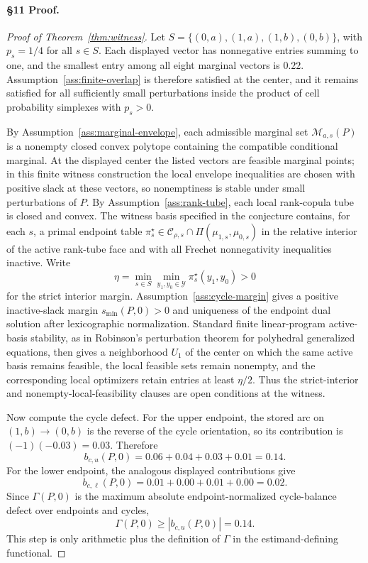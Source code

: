 \paragraph{\S11 Proof.}
\begin{proof}[Proof of Theorem~\ref{thm:witness}]
Let \(S=\{(0,a),(1,a),(1,b),(0,b)\}\), with \(p_s=1/4\) for all \(s\in S\).  Each displayed vector has nonnegative entries summing to one, and the smallest entry among all eight marginal vectors is \(0.22\).  Assumption~\ref{ass:finite-overlap} is therefore satisfied at the center, and it remains satisfied for all sufficiently small perturbations inside the product of cell probability simplexes with \(p_s>0\).

By Assumption~\ref{ass:marginal-envelope}, each admissible marginal set \(\mathcal M_{a,s}(P)\) is a nonempty closed convex polytope containing the compatible conditional marginal.  At the displayed center the listed vectors are feasible marginal points; in this finite witness construction the local envelope inequalities are chosen with positive slack at these vectors, so nonemptiness is stable under small perturbations of \(P\).  By Assumption~\ref{ass:rank-tube}, each local rank-copula tube is closed and convex.  The witness basis specified in the conjecture contains, for each \(s\), a primal endpoint table \(\pi_s^\star\in\mathcal C_{\rho,s}\cap\Pi(\mu_{1,s},\mu_{0,s})\) in the relative interior of the active rank-tube face and with all Frechet nonnegativity inequalities inactive.  Write
\[
\eta=\min_{s\in S}\min_{y_1,y_0\in\mathcal Y}\pi_s^\star(y_1,y_0)>0
\]
for the strict interior margin.  Assumption~\ref{ass:cycle-margin} gives a positive inactive-slack margin \(s_{\min}(P,0)>0\) and uniqueness of the endpoint dual solution after lexicographic normalization.  Standard finite linear-program active-basis stability, as in Robinson's perturbation theorem for polyhedral generalized equations, then gives a neighborhood \(U_1\) of the center on which the same active basis remains feasible, the local feasible sets remain nonempty, and the corresponding local optimizers retain entries at least \(\eta/2\).  Thus the strict-interior and nonempty-local-feasibility clauses are open conditions at the witness.

Now compute the cycle defect.  For the upper endpoint, the stored arc on \((1,b)\to(0,b)\) is the reverse of the cycle orientation, so its contribution is \((-1)(-0.03)=0.03\).  Therefore
\[
b_{c,u}(P,0)
=0.06+0.04+0.03+0.01
=0.14.
\]
For the lower endpoint, the analogous displayed contributions give
\[
b_{c,\ell}(P,0)=0.01+0.00+0.01+0.00=0.02.
\]
Since \(\Gamma(P,0)\) is the maximum absolute endpoint-normalized cycle-balance defect over endpoints and cycles,
\[
\Gamma(P,0)\ge |b_{c,u}(P,0)|=0.14.
\]
This step is only arithmetic plus the definition of \(\Gamma\) in the estimand-defining functional.


\end{proof}

